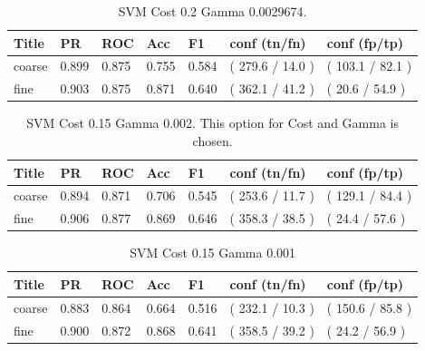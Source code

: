 \documentclass[ms]{nuthesis}
\begin{document}
\FloatBarrier
\begin{table}[H]
\centering
\caption{SVM Cost 0.2 Gamma 0.0029674.}
\label{tab:SVM-Cp2-Gp0029674}
\begin{tabular}{|l||l||l||l||l||l||l|}\toprule
Title & PR & ROC & Acc & F1 & conf (tn/fn) & conf (fp/tp) \\ \midrule
coarse & 0.899 & 0.875 & 0.755 & 0.584 & ( 279.6 / 14.0 ) & ( 103.1 / 82.1 ) \\
fine & 0.903 & 0.875 & 0.871 & 0.640 & ( 362.1 / 41.2 ) & ( 20.6 / 54.9 ) \\ \bottomrule
\end{tabular}
\end{table}
\FloatBarrier


\FloatBarrier
\begin{table}[H]
\centering
\caption{SVM Cost 0.15 Gamma 0.002. This option for Cost and Gamma is chosen.}
\label{tab:SVM-Cp15-Gp002}
\begin{tabular}{|l||l||l||l||l||l||l|}\toprule
Title & PR & ROC & Acc & F1 & conf (tn/fn) & conf (fp/tp) \\ \midrule
coarse & 0.894 & 0.871 & 0.706 & 0.545 & ( 253.6 / 11.7 ) & ( 129.1 / 84.4 ) \\
fine & 0.906 & 0.877 & 0.869 & 0.646 & ( 358.3 / 38.5 ) & ( 24.4 / 57.6 ) \\ \bottomrule
\end{tabular}
\end{table}
\FloatBarrier

\FloatBarrier
\begin{table}[H]
\centering
\caption{SVM Cost 0.15 Gamma 0.001}
\label{tab:SVM-Cp15-Gp001}
\begin{tabular}{|l||l||l||l||l||l||l|}\toprule
Title & PR & ROC & Acc & F1 & conf (tn/fn) & conf (fp/tp) \\ \midrule
coarse & 0.883 & 0.864 & 0.664 & 0.516 & ( 232.1 / 10.3 ) & ( 150.6 / 85.8 ) \\
fine & 0.900 & 0.872 & 0.868 & 0.641 & ( 358.5 / 39.2 ) & ( 24.2 / 56.9 ) \\ \bottomrule
\end{tabular}
\end{table}
\FloatBarrier
\end{document}

